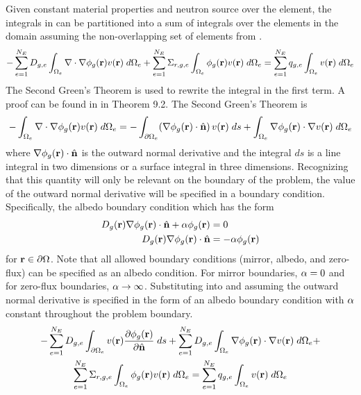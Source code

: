     Given constant material properties and neutron source over the element, 
    the integrals in  can be partitioned into a sum of 
    integrals over the elements in the domain assuming the non-overlapping set
    of elements from .
    \begin{equation} 
      \label{eq:element_by_element}
      -\sum_{e=1}^{N_E} D_{g,e} 
        \int_{\Omega_e} \mathbf{\nabla} \cdot \mathbf{\nabla} \phi_g(\mathbf{r}) v(\mathbf{r}) \; d\Omega_e +
        \sum_{e=1}^{N_E} \Sigma_{r,g,e} \int_{\Omega_e} \phi_g(\mathbf{r}) v(\mathbf{r}) 
        \;d\Omega_e = \sum_{e=1}^{N_E} q_{g,e} \int_{\Omega_e} v(\mathbf{r}) 
        \; d\Omega_e
    \end{equation}
    The Second Green's Theorem is used to rewrite the integral in the first
    term. A proof can be found in \cite{textbookli} in Theorem 9.2. The Second 
    Green's Theorem is 
    \begin{equation} 
      \label{eq:greens}
      -\int_{\Omega_e} \mathbf{\nabla} \cdot \mathbf{\nabla} \phi_g(\mathbf{r}) v(\mathbf{r}) \;d\Omega_e =
        -\int_{\partial \Omega_e}  
        (\mathbf{\nabla} \phi_g(\mathbf{r}) \cdot \hat{\mathbf{n}}) \, v(\mathbf{r})\; ds +
        \int_{\Omega_e} \mathbf{\nabla} \phi_g(\mathbf{r}) \cdot \mathbf{\nabla} v(\mathbf{r}) \; d\Omega_e
    \end{equation}
    where $\mathbf{\nabla} \phi_g(\mathbf{r}) \cdot \hat{\mathbf{n}}$ is the outward normal 
    derivative and the integral $ds$ is a line integral in two dimensions or a 
    surface integral in three dimensions. Recognizing that this quantity will
    only be relevant on the boundary of the problem, the value of the outward
    normal derivative will be specified in a boundary condition. Specifically,
    the albedo boundary condition which has the form 
    \begin{align}
      D_g(\mathbf{r}) \mathbf{\nabla} \phi_g(\mathbf{r}) \cdot \hat{\mathbf{n}} + \alpha \phi_g(\mathbf{r}) &= 0 \\
      D_g(\mathbf{r}) \mathbf{\nabla} \phi_g(\mathbf{r}) \cdot \hat{\mathbf{n}} &= -\alpha \phi_g(\mathbf{r})
    \end{align}
    for $\mathbf{r} \in \partial \Omega$. Note that all allowed boundary conditions
    (mirror, albedo, and zero-flux) can be specified as an albedo condition. For
    mirror boundaries, $\alpha = 0$ and for zero-flux boundaries, $\alpha
    \rightarrow \infty$.
    Substituting  into   and 
    assuming the outward normal derivative is specified in the form of an albedo
    boundary condition with $\alpha$ constant throughout the problem boundary.
    \begin{multline} 
      -\sum_{e=1}^{N_E} D_{g,e} \int_{\partial \Omega_e} v(\mathbf{r}) 
        \frac{\partial \phi_g(\mathbf{r})}{\partial \hat{\mathbf{n}}} \;ds + \sum_{e=1}^{N_E} 
        D_{g,e} \int_{\Omega_e} \mathbf{\nabla} \phi_g(\mathbf{r}) \cdot \mathbf{\nabla} v(\mathbf{r}) 
        \; d\Omega_e + \\
        \sum_{e=1}^{N_E} \Sigma_{r,g,e} \int_{\Omega_e} \phi_g(\mathbf{r}) v(\mathbf{r}) 
        \; d\Omega_e =
        \sum_{e=1}^{N_E} q_{g,e} \int_{\Omega_e} v(\mathbf{r}) \; d\Omega_e
    \end{multline}
